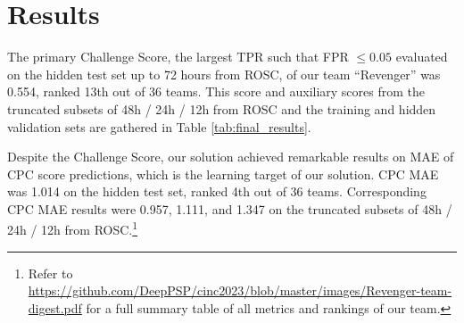 \section{Results}
\label{sec:results}



% 


The primary Challenge Score, the largest TPR such that FPR $\le 0.05$ evaluated on the hidden test set up to 72 hours from ROSC, of our team ``Revenger'' was 0.554, ranked 13th out of 36 teams. This score and auxiliary scores from the truncated subsets of 48h / 24h / 12h from ROSC and the training and hidden validation sets are gathered in Table \ref{tab:final_results}.




 Despite the Challenge Score, our solution achieved remarkable results on MAE of CPC score predictions, which is the learning target of our solution. CPC MAE was 1.014 on the hidden test set, ranked 4th out of 36 teams. Corresponding CPC MAE results were 0.957, 1.111, and 1.347 on the truncated subsets of 48h / 24h / 12h from ROSC.\footnote{Refer to \url{https://github.com/DeepPSP/cinc2023/blob/master/images/Revenger-team-digest.pdf} for a full summary table of all metrics and rankings of our team.}
